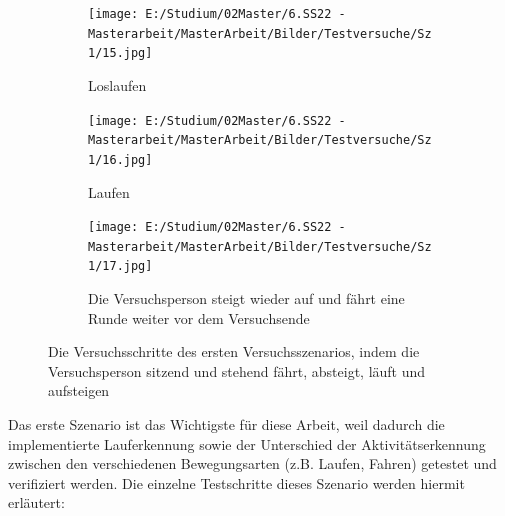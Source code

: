 \begin{figure}[htpb]
\begin{subfigure}{0.5\textwidth}
	\end{subfigure}
	\begin{subfigure}{0.35\textwidth}
		\centering
		\texttt{[image: E:/Studium/02Master/6.SS22 - Masterarbeit/MasterArbeit/Bilder/Testversuche/Sz 1/15.jpg]}
	\end{subfigure}
	\begin{subfigure}{0.5\textwidth}
		Loslaufen\\[+1.5em]
	\end{subfigure}
	\begin{subfigure}{0.35\textwidth}
		\centering
		\texttt{[image: E:/Studium/02Master/6.SS22 - Masterarbeit/MasterArbeit/Bilder/Testversuche/Sz 1/16.jpg]}
	\end{subfigure}
	\begin{subfigure}{0.5\textwidth}
		Laufen\\[+1.5em]
	\end{subfigure}
	\begin{subfigure}{0.35\textwidth}
		\centering
		\texttt{[image: E:/Studium/02Master/6.SS22 - Masterarbeit/MasterArbeit/Bilder/Testversuche/Sz 1/17.jpg]}
	\end{subfigure}
	\begin{subfigure}{0.5\textwidth}
		Die Versuchsperson steigt wieder auf und fährt eine Runde weiter vor dem Versuchsende\\[+0.4em]
	\end{subfigure}
	\caption{Die Versuchsschritte des ersten Versuchsszenarios, indem die Versuchsperson sitzend und stehend fährt, absteigt, läuft und aufsteigen}
	\label{fig:testversuch}
\end{figure}
Das erste Szenario ist das Wichtigste für diese Arbeit, weil dadurch die implementierte Lauferkennung sowie der Unterschied der Aktivitätserkennung zwischen den verschiedenen Bewegungsarten (z.B. Laufen, Fahren) getestet und verifiziert werden. Die einzelne Testschritte dieses Szenario werden hiermit erläutert:
